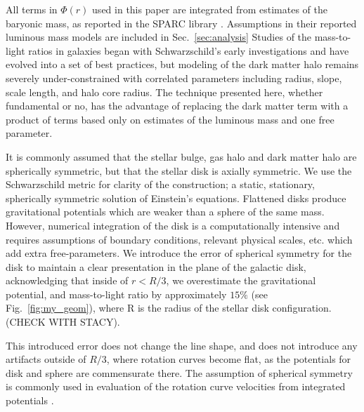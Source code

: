 \documentclass[reprint,%
 amsmath,amssymb,
 aps,
]{revtex4-1}
\begin{document}
   
 All terms in $\Phi(r)$ used in this paper  are    integrated from estimates of the baryonic mass, as reported in the      SPARC  library \cite{2016Lelli}.  
   Assumptions in their reported luminous mass models  are included in Sec.~\ref{sec:analysis}
Studies of the mass-to-light ratios in galaxies began with Schwarzschild's early investigations \cite{1954AJ.....59..273S} and have evolved into a set of best practices, but modeling of the 
dark matter halo remains severely   under-constrained with correlated parameters including radius, slope, scale length, and halo core radius.     
The technique presented here, whether fundamental or no,  has the advantage of replacing the dark matter term  with a product of terms based only on estimates of the luminous mass and   one free parameter.


It is commonly assumed that   the stellar bulge, gas halo and   dark matter halo are spherically symmetric, but that the stellar disk is axially symmetric. We use 
the Schwarzschild metric   for clarity of the construction;  a static, stationary, spherically symmetric solution of Einstein's equations.
Flattened disks produce gravitational potentials which are weaker than a sphere of the same mass\cite{Chatterjee}. However, numerical integration of the disk is a computationally intensive and requires assumptions of  boundary conditions,   relevant physical scales,  etc. which add extra free-parameters\cite{2011A&A...531A..36H}. We 
  introduce the error of spherical symmetry   for the disk to maintain a clear presentation in the plane of the galactic disk, acknowledging  that inside of $r< R/3$, we   overestimate the gravitational potential, and  mass-to-light ratio by approximately $15\%$ (see Fig.~\ref{fig:my_geom}),  where R is the radius of the stellar disk configuration.  (CHECK WITH STACY). 


This introduced error does not change  the line shape, and   does not introduce any artifacts outside of $R/3$, where rotation curves become flat,  as the potentials for disk and sphere are commensurate there. The assumption of spherical symmetry is commonly used   in evaluation of the   rotation curve velocities from integrated potentials \cite{2022A&A...664A..40M,PhysRevD.70.083509}. 
 
\end{document}
